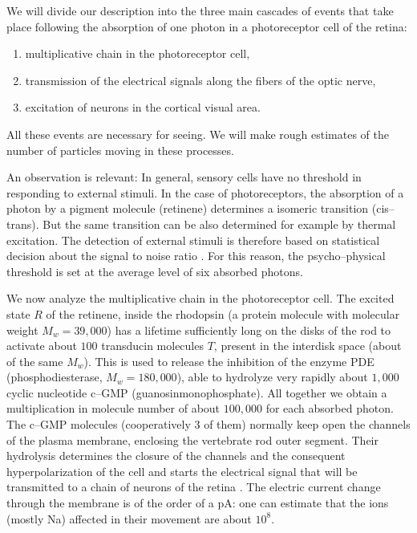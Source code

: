 \documentclass[12pt]{article}
\begin{document}
We will divide our description into the three main cascades of
events that take place following the absorption of one photon in a
photoreceptor cell of the retina:
\begin{enumerate}
\item multiplicative chain in the photoreceptor cell,
\item transmission of the electrical signals along the fibers of
the optic nerve,
\item excitation of neurons in the cortical visual area.
\end{enumerate}
All these events are necessary for seeing. We will make rough
estimates of the number of particles moving in these processes.

An observation is relevant: In general, sensory cells have no
threshold in responding to external stimuli. In the case of
photoreceptors, the absorption of a photon by a pigment molecule
(retinene) determines a isomeric transition (cis--trans). But the
same transition can be also determined for example by thermal
excitation. The detection of external stimuli is therefore based
on statistical decision about the signal to noise ratio
\cite{bia}. For this reason, the psycho--physical threshold is set
at the average level of six absorbed photons.

We now analyze the multiplicative chain in the photoreceptor cell.
The excited state $R$ of the retinene, inside the rhodopsin (a
protein molecule with molecular weight $M_{w} = 39,000$) has a
lifetime sufficiently long on the disks of the rod to activate
about $100$ transducin molecules $T$, present in the interdisk
space (about of the same $M_{w}$). This is used to release the
inhibition of the enzyme PDE (phosphodiesterase, $M_{w} =
180,000$), able to hydrolyze very rapidly about $1,000$ cyclic
nucleotide c--GMP (guanosinmonophosphate). All together we obtain
a multiplication in molecule number of about $100,000$ for each
absorbed photon. The c--GMP molecules (cooperatively 3 of them)
normally keep open the channels of the plasma membrane, enclosing
the vertebrate rod outer segment. Their hydrolysis determines the
closure of the channels and the consequent hyperpolarization of
the cell and starts the electrical signal that will be transmitted
to a chain of neurons of the retina \cite{bpc}. The electric
current change through the membrane is of the order of a pA: one
can estimate that the ions (mostly Na) affected in their movement
are about $10^{8}$.
\end{document}
